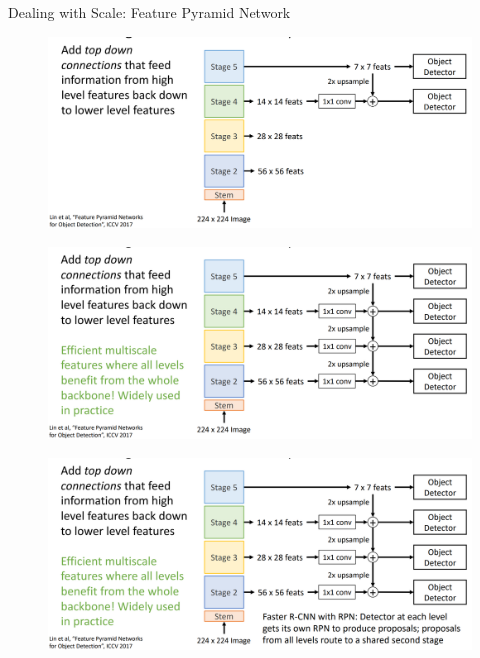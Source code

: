 \begin{frame}[allowframebreaks]{Dealing with Scale: Feature Pyramid Network}
\begin{figure}
\centering
\includegraphics[width=1.0\textwidth,height=1.0\textheight,keepaspectratio]{images/object-detect/scale_6.png}
\end{figure}

\framebreak

\begin{figure}
\centering
\includegraphics[width=1.0\textwidth,height=1.0\textheight,keepaspectratio]{images/object-detect/scale_7.png}
\end{figure}

\framebreak

\begin{figure}
\centering
\includegraphics[width=1.0\textwidth,height=1.0\textheight,keepaspectratio]{images/object-detect/scale_8.png}
\end{figure}
    
\end{frame}


